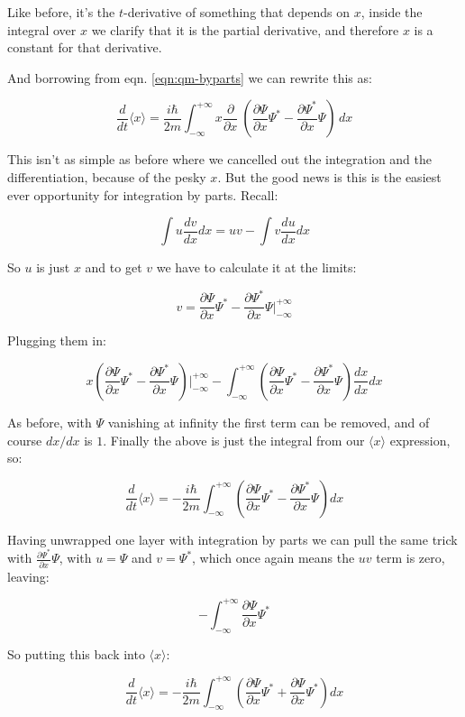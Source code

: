 Like before, it's the $t$-derivative of something that depends on $x$, inside the integral over $x$ we clarify that it is the partial derivative, and therefore $x$ is a constant for that derivative.

And borrowing from eqn. \ref{eqn:qm-byparts} we can rewrite this as:

$$
\frac{d}{dt} \langle x \rangle =
\frac{i \hbar}{2m}
\int_{-\infty}^{+\infty}
x
\frac{\partial}{\partial x} \
\left(
\frac{\partial \Psi}{\partial x}\Psi^*
- \frac{\partial \Psi^*}{\partial x}\Psi
\right)
\,dx
$$

This isn't as simple as before where we cancelled out the integration and the differentiation, because of the pesky $x$. But the good news is this is the easiest ever opportunity for integration by parts. Recall:

$$
\int
u
\frac{dv}{dx}
dx = uv -
\int
v
\frac{du}{dx}
dx
$$

So $u$ is just $x$ and to get $v$ we have to calculate it at the limits:

$$
v =
\frac{\partial \Psi}{\partial x}\Psi^*
- \frac{\partial \Psi^*}{\partial x}\Psi
\bigg\rvert_{-\infty}^{+\infty}
$$

Plugging them in:

$$
x
\left(
\frac{\partial \Psi}{\partial x}\Psi^*
- \frac{\partial \Psi^*}{\partial x}\Psi
\right)
\bigg\rvert_{-\infty}^{+\infty}
-
\int_{-\infty}^{+\infty}
\left(
\frac{\partial \Psi}{\partial x}\Psi^*
- \frac{\partial \Psi^*}{\partial x}\Psi
\right)
\frac{dx}{dx}
dx
$$

As before, with $\Psi$ vanishing at infinity the first term can be removed, and of course $dx/dx$ is $1$. Finally the above is just the integral from our $\langle x \rangle$ expression, so:

$$
\frac{d}{dt} \langle x \rangle = -
\frac{i \hbar}{2m}
\int_{-\infty}^{+\infty}
\left(
\frac{\partial \Psi}{\partial x}\Psi^*
- \frac{\partial \Psi^*}{\partial x}\Psi
\right)
dx
$$

Having unwrapped one layer with integration by parts we can pull the same trick with $\frac{\partial \Psi^*}{\partial x}\Psi$, with $u = \Psi$ and $v = \Psi^*$, which once again means the $uv$ term is zero, leaving:

$$
-
\int_{-\infty}^{+\infty}
\frac{\partial \Psi}{\partial x}
\Psi^*
$$

So putting this back into $\langle x \rangle$:

$$
\frac{d}{dt} \langle x \rangle = -
\frac{i \hbar}{2m}
\int_{-\infty}^{+\infty}
\left(
\frac{\partial \Psi}{\partial x}\Psi^*
+ \frac{\partial \Psi}{\partial x}\Psi^*
\right)
dx
$$

